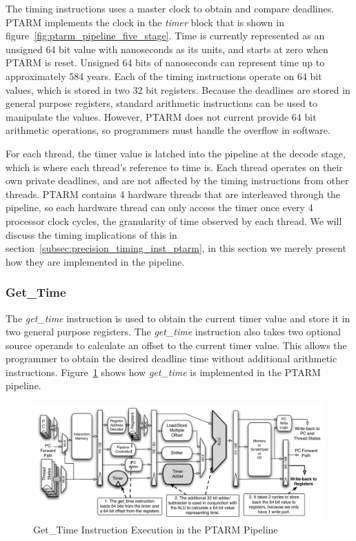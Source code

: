 The timing instructions uses a master clock to obtain and compare deadlines.
PTARM implements the clock in the \emph{timer} block that is shown in figure~\ref{fig:ptarm_pipeline_five_stage}.   
Time is currently represented as an unsigned 64 bit value with nanoseconds as its units, and starts at zero when PTARM is reset. 
Unsigned 64 bits of nanoseconds can represent time up to approximately 584 years.
Each of the timing instructions operate on 64 bit values, which is stored in two 32 bit registers.
Because the deadlines are stored in general purpose registers, standard arithmetic instructions can be used to manipulate the values. 
However, PTARM does not current provide 64 bit arithmetic operations, so programmers must handle the overflow in software.

For each thread, the timer value is latched into the pipeline at the decode stage, which is where each thread's reference to time is.
Each thread operates on their own private deadlines, and are not affected by the timing instructions from other threads.
PTARM contains 4 hardware threads that are interleaved through the pipeline, so each hardware thread can only access the timer once every 4 processor clock cycles, the granularity of time observed by each thread.
We will discuss the timing implications of this in section~\ref{subsec:precision_timing_inst_ptarm}, in this section we merely present how they  are implemented in the pipeline.
	
\subsubsection{Get\_Time}    
The \emph{get\_time} instruction is used to obtain the current timer value and store it in two general purpose registers.
The \emph{get\_time} instruction also takes two optional source operands to calculate an offset to the current timer value. 
This allows the programmer to obtain the desired deadline time without additional arithmetic instructions.
Figure~\ref{fig:get_time_pipeline_implementation} shows how \emph{get\_time} is implemented in the PTARM pipeline. 
\begin{figure}
  \vspace{-20pt}
  \begin{center}
    \includegraphics[scale=.54]{figs/get_time_pipeline_implementation}
  \end{center}
  \vspace{-20pt}
  \caption{Get\_Time Instruction Execution in the PTARM Pipeline}
  \label{fig:get_time_pipeline_implementation}
\end{figure}

